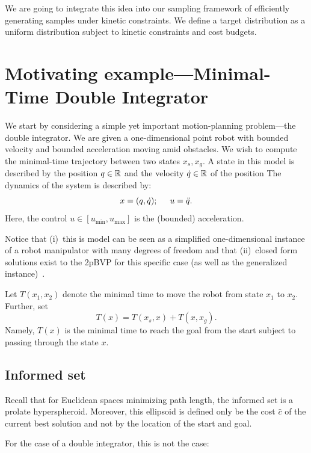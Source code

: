 \documentclass[letterpaper, 10 pt, conference]{ieeeconf}  %
\begin{document}
We are going to integrate this idea into our sampling framework of efficiently generating samples under kinetic constraints. 
We define a target distribution as a uniform distribution subject to kinetic constraints and cost budgets.

\section{Motivating example---Minimal-Time Double Integrator}
We start by considering a simple yet important motion-planning problem---the double integrator.
We are given a one-dimensional point robot  with bounded velocity and bounded acceleration moving amid obstacles. We wish to compute the minimal-time trajectory between two states $x_s, x_g$.
A state in this model is described by 
the position $q \in \mathbb{R}$
and
the velocity $\dot{q}\in \mathbb{R}$ of the position
The dynamics of the system is described by:
$$
x = (q, \dot{q}); 
\hspace{5mm}
u = \ddot{q}.
$$
Here, the control $u \in [u_{\text{min}}, u_{\text{max}}]$ is the (bounded) acceleration. 


Notice that 
(i)~this is model can be seen as a simplified one-dimensional instance of a robot manipulator with many degrees of freedom and that
(ii)~closed form solutions exist to the 2pBVP for this specific case (as well as the generalized instance)~\cite{HN10}.

Let $T(x_1, x_2)$ denote the minimal time to move the robot from state $x_1$ to $x_2$.
Further, set
$$
T(x) = T(x_s, x) + T(x, x_g).
$$ 
Namely, $T(x)$ is the minimal time to reach the goal from the start subject to passing through the state $x$.

\subsection{Informed set}
Recall that for Euclidean spaces minimizing path length, the informed set is a prolate hyperspheroid.
Moreover, this ellipsoid is defined only be the cost $\hat{c}$ of the current best solution and not by the location of the start and goal.

For the case of a double integrator, this is not the case:
\end{document}
